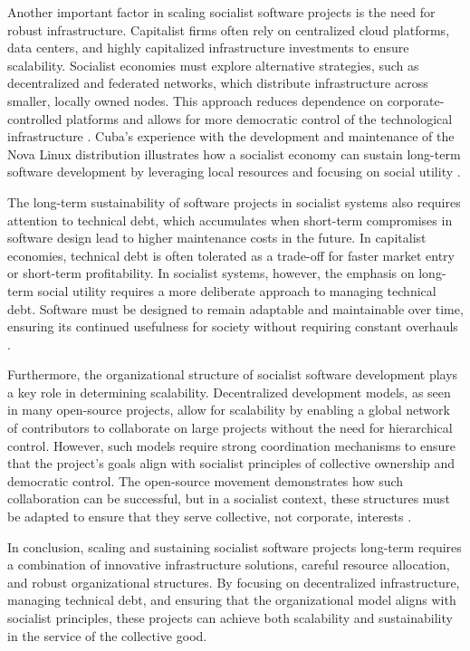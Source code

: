 \begin{refsection}
Another important factor in scaling socialist software projects is the need for robust infrastructure. Capitalist firms often rely on centralized cloud platforms, data centers, and highly capitalized infrastructure investments to ensure scalability. Socialist economies must explore alternative strategies, such as decentralized and federated networks, which distribute infrastructure across smaller, locally owned nodes. This approach reduces dependence on corporate-controlled platforms and allows for more democratic control of the technological infrastructure \cite[pp.~24-27]{moglen2003}. Cuba’s experience with the development and maintenance of the Nova Linux distribution illustrates how a socialist economy can sustain long-term software development by leveraging local resources and focusing on social utility \cite[pp.~67-70]{guevara1968}.

The long-term sustainability of software projects in socialist systems also requires attention to technical debt, which accumulates when short-term compromises in software design lead to higher maintenance costs in the future. In capitalist economies, technical debt is often tolerated as a trade-off for faster market entry or short-term profitability. In socialist systems, however, the emphasis on long-term social utility requires a more deliberate approach to managing technical debt. Software must be designed to remain adaptable and maintainable over time, ensuring its continued usefulness for society without requiring constant overhauls \cite[pp.~45-50]{raymond1999}.

Furthermore, the organizational structure of socialist software development plays a key role in determining scalability. Decentralized development models, as seen in many open-source projects, allow for scalability by enabling a global network of contributors to collaborate on large projects without the need for hierarchical control. However, such models require strong coordination mechanisms to ensure that the project’s goals align with socialist principles of collective ownership and democratic control. The open-source movement demonstrates how such collaboration can be successful, but in a socialist context, these structures must be adapted to ensure that they serve collective, not corporate, interests \cite[pp.~145-148]{raymond1999}.

In conclusion, scaling and sustaining socialist software projects long-term requires a combination of innovative infrastructure solutions, careful resource allocation, and robust organizational structures. By focusing on decentralized infrastructure, managing technical debt, and ensuring that the organizational model aligns with socialist principles, these projects can achieve both scalability and sustainability in the service of the collective good.


\end{refsection}
